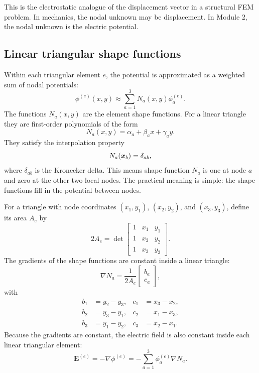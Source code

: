\documentclass[11pt]{article}
\newcommand{\Evec}{\mathbf{E}}
\begin{document}
This is the electrostatic analogue of the displacement vector in a structural FEM problem. In mechanics, the nodal unknown may be displacement. In Module 2, the nodal unknown is the electric potential.

\subsection{Linear triangular shape functions}

Within each triangular element $e$, the potential is approximated as a weighted sum of nodal potentials:
\begin{equation}
\phi^{(e)}(x,y) \approx \sum_{a=1}^{3} N_a(x,y) \phi_a^{(e)}.
\end{equation}
The functions $N_a(x,y)$ are the element shape functions. For a linear triangle they are first-order polynomials of the form
\begin{equation}
N_a(x,y)=\alpha_a+\beta_a x+\gamma_a y.
\end{equation}
They satisfy the interpolation property
\begin{equation}
N_a(\bm{x}_b)=\delta_{ab},
\end{equation}
where $\delta_{ab}$ is the Kronecker delta. This means shape function $N_a$ is one at node $a$ and zero at the other two local nodes. The practical meaning is simple: the shape functions fill in the potential between nodes.

For a triangle with node coordinates $(x_1,y_1)$, $(x_2,y_2)$, and $(x_3,y_3)$, define its area $A_e$ by
\begin{equation}
2A_e =
\det
\begin{bmatrix}
1 & x_1 & y_1 \\
1 & x_2 & y_2 \\
1 & x_3 & y_3
\end{bmatrix}.
\end{equation}
The gradients of the shape functions are constant inside a linear triangle:
\begin{equation}
\nabla N_a = \frac{1}{2A_e}
\begin{bmatrix}
 b_a \\
 c_a
\end{bmatrix},
\end{equation}
with
\begin{align}
b_1 &= y_2-y_3, & c_1 &= x_3-x_2, \\
b_2 &= y_3-y_1, & c_2 &= x_1-x_3, \\
b_3 &= y_1-y_2, & c_3 &= x_2-x_1.
\end{align}
Because the gradients are constant, the electric field is also constant inside each linear triangular element:
\begin{equation}
\Evec^{(e)} = -\nabla \phi^{(e)}
= -\sum_{a=1}^{3} \phi_a^{(e)} \nabla N_a.
\end{equation}
\end{document}
